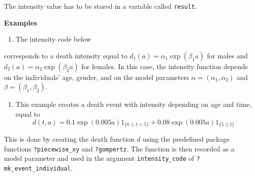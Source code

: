 The intensity value has to be stored in a variable called \texttt{result}.

\textbf{Examples}

\begin{enumerate}
\def\labelenumi{\arabic{enumi}.}
\tightlist
\item
  The intensity code below
\end{enumerate}

\begin{Shaded}
\begin{Highlighting}[]
\OtherTok{\textless{}{-}} 
\end{Highlighting}
\end{Shaded}

corresponds to a death intensity equal to \(d_1(a) = \alpha_1 \exp(\beta_1 a)\) for males and \(d_2(a) = \alpha_2 \exp(\beta_2 a)\) for females. In this case, the intensity function depends on the individuals' age, gender, and on the model parameters \(\alpha = (\alpha_1, \alpha_2)\) and \(\beta = (\beta_1, \beta_2)\).

\begin{enumerate}
\def\labelenumi{\arabic{enumi}.}
\setcounter{enumi}{1}
\tightlist
\item
  This example creates a death event with intensity depending on age and time, equal to
  \begin{equation*}
  d(t,a) = 0.1\exp(0.005a) 1_{\{0\leq t <5\}} + 0.08\exp(0.005a) 1_{\{5\leq t\}}
  \end{equation*}
\end{enumerate}

This is done by creating the death function \(d\) using the predefined package functions \texttt{?piecewise\_xy} and \texttt{?gompertz}. The function is then recorded as a model parameter and used in the argument \texttt{intensity\_code} of \texttt{?mk\_event\_individual}.

